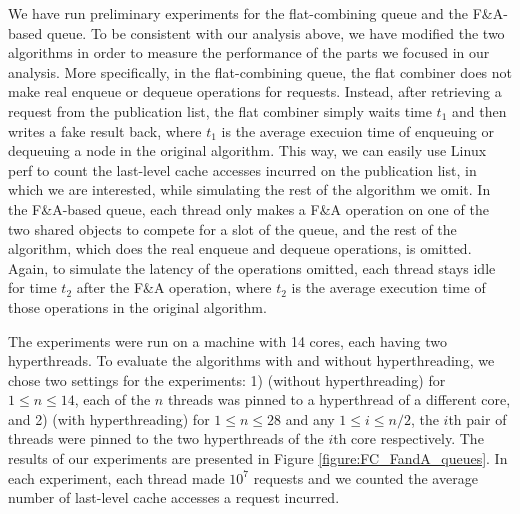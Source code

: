 \documentclass[11pt]{article}
\begin{document}
We have run preliminary experiments for the flat-combining queue and the F\&A-based queue. 
To be consistent with our analysis above, we have modified the two algorithms in order to 
measure the performance of the parts we focused in our analysis.  
More specifically, in the flat-combining queue, the flat combiner does not make 
real enqueue or dequeue operations for requests. 
Instead, after retrieving a request from the publication list, 
the flat combiner simply waits time $t_1$ and then writes a fake result back, 
where $t_1$ is the average execuion time of enqueuing or dequeuing a node in the original algorithm. 
This way, we can easily use Linux perf to count the last-level cache accesses incurred 
on the publication list, in which we are interested, while simulating the rest of the algorithm we omit. 
In the F\&A-based queue, each thread only makes a F\&A operation on one of the two shared objects 
to compete for a slot of the queue, and the rest of the algorithm, 
which does the real enqueue and dequeue operations, is omitted. 
Again, to simulate the latency of the operations omitted, each thread stays idle for time $t_2$ after 
the F\&A operation, where $t_2$ is the average execution time of those operations in the original algorithm.


The experiments were run on a machine with 14 cores, each having two hyperthreads. 
To evaluate the algorithms with and without hyperthreading, we chose two settings for the experiments: 
1) (without hyperthreading) for $1 \le n \le 14$, 
each of the $n$ threads was pinned to a hyperthread of a different core, and
2) (with hyperthreading) for $1 \le n \le 28$ and any $1\le i \le n/2$, 
the $i$th pair of threads were pinned to the two hyperthreads of the $i$th core respectively. 
The results of our experiments are presented in Figure \ref{figure:FC_FandA_queues}. 
In each experiment, each thread made $10^7$ requests and we counted the average number of last-level cache 
accesses a request incurred. 
\end{document}
